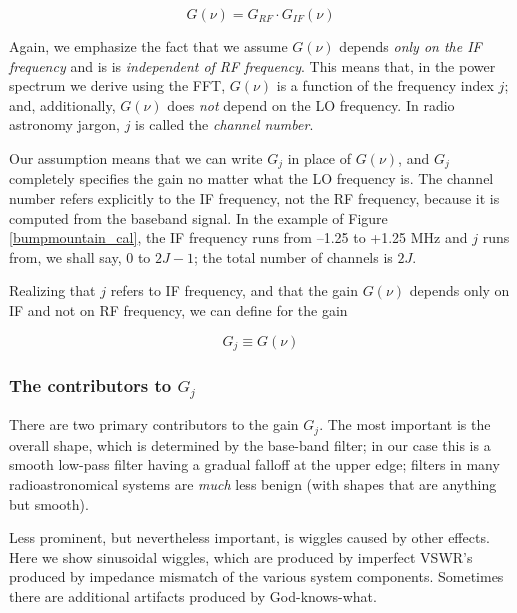 \documentclass[preprint]{aastex}
\begin{document}
\begin{equation}
G(\nu) = G_{RF} \cdot G_{IF}(\nu)
\end{equation}	

	Again, we emphasize the fact that we assume $G(\nu)$ depends
{\it only on the IF frequency} and is is {\it independent of RF
frequency}. This means that, in the power spectrum we derive using the
FFT, $G(\nu)$ is a function of the frequency index $j$; and,
additionally, $G(\nu)$ does {\it not} depend on the LO frequency. In
radio astronomy jargon, $j$ is called the {\it channel number}. 

	Our assumption means that we can write $G_j$ in place of
$G(\nu)$, and $G_j$ completely specifies the gain no matter what the LO
frequency is. The channel number refers explicitly to the IF frequency,
not the RF frequency, because it is computed from the baseband signal.
In the example of Figure \ref{bumpmountain_cal}, the IF frequency runs
from --1.25 to +1.25 MHz and $j$ runs from, we shall say, 0 to $2J-1$;
the total number of channels is $2J$. 

	Realizing that $j$ refers to IF frequency, and that the gain
$G(\nu)$ depends only on IF and not on RF frequency, we can define for
the gain

\begin{equation}
G_j \equiv G(\nu)
\end{equation}

\subsubsection{The contributors to $G_j$ }

	There are two primary contributors to the gain $G_j$.  The most
important is the overall shape, which is determined by the base-band
filter; in our case this is a smooth low-pass filter having a gradual
falloff at the upper edge; filters in many radioastronomical systems are
{\it much} less benign (with shapes that are anything but smooth).

	Less prominent, but nevertheless important, is wiggles caused by
other effects. Here we show sinusoidal wiggles, which  are produced by
imperfect VSWR's produced by impedance mismatch of the various system
components. Sometimes there are additional artifacts produced by
God-knows-what.

\end{document}

